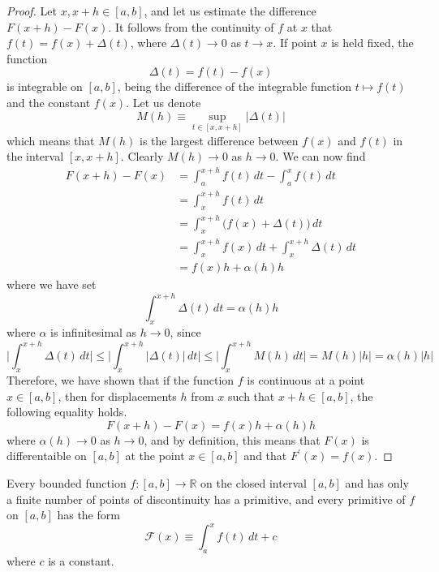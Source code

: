   \begin{proof}
    Let $x, x + h \in [a, b]$, and let us estimate the difference $F(x+h) - F(x)$. It follows from the continuity of $f$ at $x$ that $f(t) = f(x) + \Delta(t)$, where $\Delta(t) \rightarrow 0$ as $t \rightarrow x$. If point $x$ is held fixed, the function 
    \[\Delta(t) = f(t) - f(x)\]
    is integrable on $[a, b]$, being the difference of the integrable function $t \mapsto f(t)$ and the constant $f(x)$. Let us denote
    \[M(h) \equiv \sup_{t \in [x, x+h]} |\Delta(t)|\]
    which means that $M(h)$ is the largest difference between $f(x)$ and $f(t)$ in the interval $[x, x+h]$. Clearly $M(h) \rightarrow 0$ as $h \rightarrow 0$. We can now find
    \begin{align*}
        F(x + h) - F(x) & = \int_a^{x+h} f(t)\,dt - \int_a^x f(t)\,dt \\
        & = \int_x^{x+h} f(t)\,dt \\
        & = \int_x^{x+h} \big( f(x) + \Delta(t)\big)\,dt \\
        & = \int_x^{x+h} f(x)\,dt + \int_x^{x+h} \Delta(t)\,dt \\
        & = f(x) h + \alpha(h) h
    \end{align*}
    where we have set 
    \[\int_x^{x+h} \Delta(t)\,dt = \alpha(h) h\]
    where $\alpha$ is infinitesimal as $h \rightarrow 0$, since 
    \[\Bigg| \int_x^{x+h} \Delta(t)\,dt \Bigg| \leq \Bigg| \int_x^{x+h} |\Delta(t)|\,dt \Bigg| \leq \Bigg| \int_x^{x+h} M(h)\,dt \Bigg| = M(h) |h| = \alpha(h)|h|\]
    Therefore, we have shown that if the function $f$ is continuous at a point $x \in [a, b]$, then for displacements $h$ from $x$ such that $x +h \in [a, b]$, the following equality holds.
    \[F(x + h) - F(x) = f(x) h + \alpha(h) h\]
    where $\alpha(h) \rightarrow 0$ as $h \rightarrow 0$, and by definition, this means that $F(x)$ is differentaible on $[a, b]$ at the point $x \in [a, b]$ and that $F^\prime(x) = f(x)$. 
  \end{proof}

  \begin{corollary}
  Every bounded function $f: [a, b] \longrightarrow \mathbb{R}$ on the closed interval $[a, b]$ and has only a finite number of points of discontinuity has a primitive, and every primitive of $f$ on $[a, b]$ has the form 
  \[\mathcal{F}(x) \equiv \int_a^x f(t)\,dt + c\]
  where $c$ is a constant. 
  \end{corollary}


